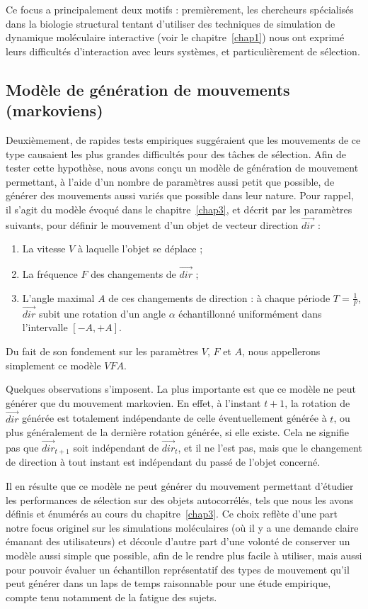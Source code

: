 	Ce focus a principalement deux motifs : premièrement, les chercheurs spécialisés dans la biologie structural tentant d'utiliser des techniques de simulation de dynamique moléculaire interactive (voir le chapitre~\ref{chap1}) nous ont exprimé leurs difficultés d'interaction avec leurs systèmes, et particulièrement de sélection.
	
	\subsection{Modèle de génération de mouvements (markoviens)}
	
	Deuxièmement, de rapides tests empiriques suggéraient que les mouvements de ce type causaient les plus grandes difficultés pour des tâches de sélection. Afin de tester cette hypothèse, nous avons conçu un modèle de génération de mouvement permettant, à l'aide d'un nombre de paramètres aussi petit que possible, de générer des mouvements aussi variés que possible dans leur nature. Pour rappel, il s'agit du modèle évoqué dans le chapitre~\ref{chap3}, et décrit par les paramètres suivants, pour définir le mouvement d'un objet de vecteur direction $\vec{dir}$ :
	
    \begin{enumerate}
    	\item La vitesse $V$ à laquelle l'objet se déplace ;
    	\item La fréquence $F$ des changements de $\vec{dir}$ ;
    	\item L'angle maximal $A$ de ces changements de direction : à chaque période $T = \frac{1}{F}$, $\vec{dir}$ subit une rotation d'un angle $\alpha$ échantillonné uniformément dans l'intervalle $[-A, +A]$.
    \end{enumerate}
    
    Du fait de son fondement sur les paramètres $V$, $F$ et $A$, nous appellerons simplement ce modèle $VFA$.
    
    Quelques observations s'imposent. La plus importante est que ce modèle ne peut générer que du mouvement markovien. En effet, à l'instant $t+1$, la rotation de $\vec{dir}$ générée est totalement indépendante de celle éventuellement générée à $t$, ou plus généralement de la dernière rotation générée, si elle existe. Cela ne signifie pas que $\vec{dir}_{t+1}$ soit indépendant de $\vec{dir}_{t}$, et il ne l'est pas, mais que le changement de direction à tout instant est indépendant du passé de l'objet concerné.
    
    Il en résulte que ce modèle ne peut générer du mouvement permettant d'étudier les performances de sélection sur des objets autocorrélés, tels que nous les avons définis et énumérés au cours du chapitre~\ref{chap3}. Ce choix reflète d'une part notre focus originel sur les simulations moléculaires (où il y a une demande claire émanant des utilisateurs) et découle d'autre part d'une volonté de conserver un modèle aussi simple que possible, afin de le rendre plus facile à utiliser, mais aussi pour pouvoir évaluer un échantillon représentatif des types de mouvement qu'il peut générer dans un laps de temps raisonnable pour une étude empirique, compte tenu notamment de la fatigue des sujets.
    
